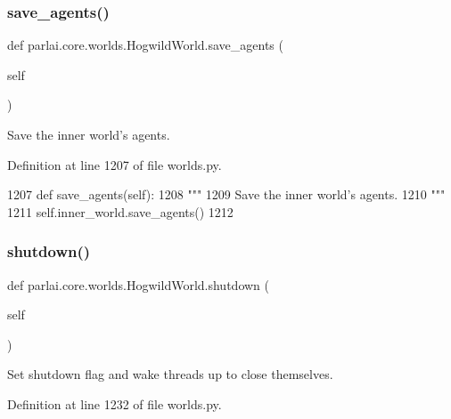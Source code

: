\subsubsection{\texorpdfstring{save\+\_\+agents()}{save\_agents()}}
{\footnotesize\ttfamily def parlai.\+core.\+worlds.\+Hogwild\+World.\+save\+\_\+agents (\begin{DoxyParamCaption}\item[{}]{self }\end{DoxyParamCaption})}

\begin{DoxyVerb}Save the inner world's agents.
\end{DoxyVerb}
 

Definition at line 1207 of file worlds.\+py.


\begin{DoxyCode}
1207     \textcolor{keyword}{def }save\_agents(self):
1208         \textcolor{stringliteral}{"""}
1209 \textcolor{stringliteral}{        Save the inner world's agents.}
1210 \textcolor{stringliteral}{        """}
1211         self.inner\_world.save\_agents()
1212 
\end{DoxyCode}
\mbox{\label{classparlai_1_1core_1_1worlds_1_1HogwildWorld_a3960deb08a179884b1eea2e423437db2}} 
\subsubsection{\texorpdfstring{shutdown()}{shutdown()}}
{\footnotesize\ttfamily def parlai.\+core.\+worlds.\+Hogwild\+World.\+shutdown (\begin{DoxyParamCaption}\item[{}]{self }\end{DoxyParamCaption})}

\begin{DoxyVerb}Set shutdown flag and wake threads up to close themselves.
\end{DoxyVerb}
 

Definition at line 1232 of file worlds.\+py.



